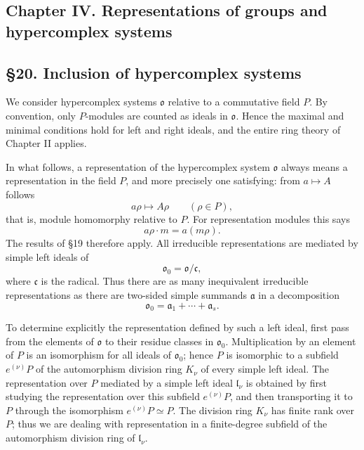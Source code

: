 \documentclass[
  11pt,
]{article}
\begin{document}
\subsection{Chapter IV. Representations of groups and hypercomplex
systems}\label{chapter-iv.-representations-of-groups-and-hypercomplex-systems}

\subsection{§20. Inclusion of hypercomplex
systems}\label{inclusion-of-hypercomplex-systems}

We consider hypercomplex systems \(\mathfrak{o}\) relative to a
commutative field \(P\). By convention, only \(P\)-modules are counted
as ideals in \(\mathfrak{o}\). Hence the maximal and minimal conditions
hold for left and right ideals, and the entire ring theory of Chapter II
applies.

In what follows, a representation of the hypercomplex system
\(\mathfrak{o}\) always means a representation in the field \(P\), and
more precisely one satisfying: from \(a\mapsto A\) follows \[
  a\rho\mapsto A\rho\qquad(\rho\in P),
\] that is, module homomorphy relative to \(P\). For representation
modules this says \[
  a\rho\cdot m=a(m\rho).
\] The results of §19 therefore apply. All irreducible representations
are mediated by simple left ideals of \[
  \mathfrak{o}_0=\mathfrak{o}/\mathfrak c,
\] where \(\mathfrak c\) is the radical. Thus there are as many
inequivalent irreducible representations as there are two-sided simple
summands \(\mathfrak a\) in a decomposition \[
  \mathfrak{o}_0=\mathfrak a_1+\cdots+\mathfrak a_s.
\]

To determine explicitly the representation defined by such a left ideal,
first pass from the elements of \(\mathfrak{o}\) to their residue
classes in \(\mathfrak{o}_0\). Multiplication by an element of \(P\) is
an isomorphism for all ideals of \(\mathfrak{o}_0\); hence \(P\) is
isomorphic to a subfield \(e^{(\nu)}P\) of the automorphism division
ring \(K_\nu\) of every simple left ideal. The representation over \(P\)
mediated by a simple left ideal \(\mathfrak l_\nu\) is obtained by first
studying the representation over this subfield \(e^{(\nu)}P\), and then
transporting it to \(P\) through the isomorphism \(e^{(\nu)}P\simeq P\).
The division ring \(K_\nu\) has finite rank over \(P\); thus we are
dealing with representation in a finite-degree subfield of the
automorphism division ring of \(\mathfrak l_\nu\).
\end{document}
